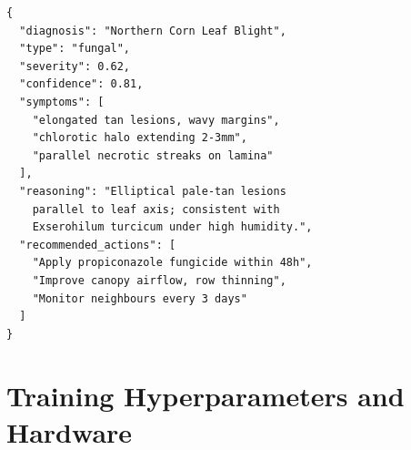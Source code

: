 \documentclass{article}
\begin{document}
\begin{lstlisting}
{
  "diagnosis": "Northern Corn Leaf Blight",
  "type": "fungal",
  "severity": 0.62,
  "confidence": 0.81,
  "symptoms": [
    "elongated tan lesions, wavy margins",
    "chlorotic halo extending 2-3mm",
    "parallel necrotic streaks on lamina"
  ],
  "reasoning": "Elliptical pale-tan lesions
    parallel to leaf axis; consistent with
    Exserohilum turcicum under high humidity.",
  "recommended_actions": [
    "Apply propiconazole fungicide within 48h",
    "Improve canopy airflow, row thinning",
    "Monitor neighbours every 3 days"
  ]
}
\end{lstlisting}

\section{Training Hyperparameters and Hardware}
\label{app:hyperparams}
\end{document}
